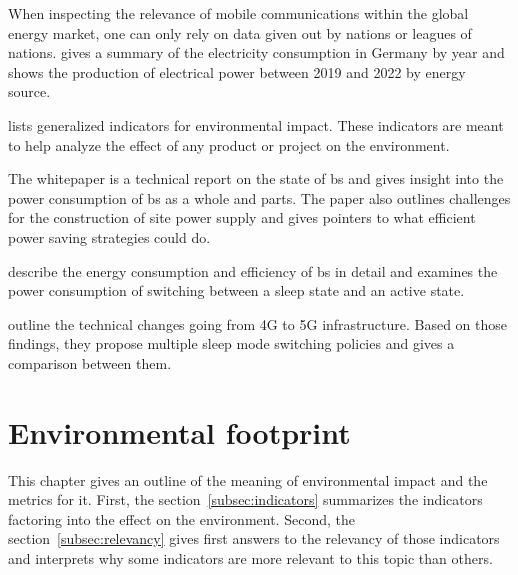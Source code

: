 \documentclass[11pt,a4paper]{article}
\begin{document}
When inspecting the relevance of mobile communications within the global energy market, one can only rely on data given out by nations or leagues of nations.
\citep{Stromverbrauch} gives a summary of the electricity consumption in Germany by year and \citep{Bruttostromerzeugung} shows the production of electrical power between 2019 and 2022 by energy source.

\citep{Umweltindikatoren} lists generalized indicators for environmental impact.
These indicators are meant to help analyze the effect of any product or project on the environment.

The whitepaper \citep{powerwhitepaper} is a technical report on the state of \acrshort{bs} and gives insight into the power consumption of \acrshort{bs} as a whole and parts.
The paper also outlines challenges for the construction of site power supply and gives pointers to what efficient power saving strategies could do.

\citep{5GEfficiencyOverview} describe the energy consumption and efficiency of \acrshort{bs} in detail and examines the power consumption of switching between a sleep state and an active state.

\citep{DynamicSleepModeControl} outline the technical changes going from 4G to 5G infrastructure.
Based on those findings, they propose multiple sleep mode switching policies and gives a comparison between them.

\section{Environmental footprint}\label{sec:energyfootprint}
This chapter gives an outline of the meaning of environmental impact and the metrics for it.
First, the section~\ref{subsec:indicators} summarizes the indicators factoring into the effect on the environment.
Second, the section~\ref{subsec:relevancy} gives first answers to the relevancy of those indicators and interprets why some indicators are more relevant to this topic than others.
\end{document}
